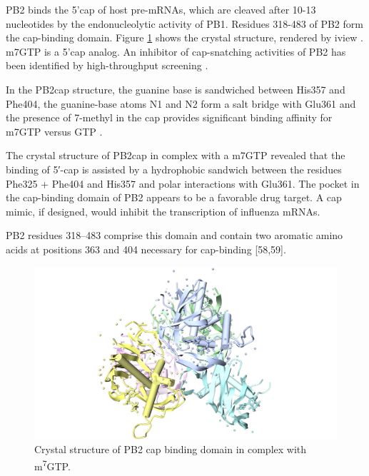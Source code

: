 PB2 binds the 5'cap of host pre-mRNAs, which are cleaved after 10-13 nucleotides by the endonucleolytic activity of PB1. Residues 318-483 of PB2 form the cap-binding domain. Figure \ref{influenza:2VQZ} shows the crystal structure, rendered by iview \citep{1366}. m7GTP is a 5'cap analog. An inhibitor of cap-snatching activities of PB2 has been identified by high-throughput screening \citep{1236}.

In the PB2cap structure, the guanine base is sandwiched between His357 and Phe404, the guanine-base atoms N1 and N2 form a salt bridge with Glu361 and the presence of 7-methyl in the cap provides significant binding affinity for m7GTP versus GTP \citep{1192}.

The crystal structure of PB2cap in complex with a m7GTP revealed that the binding of 5′-cap is assisted by a hydrophobic sandwich between the residues Phe325 + Phe404 and His357 and polar interactions with Glu361. The pocket in the cap-binding domain of PB2 appears to be a favorable drug target. A cap mimic, if designed, would inhibit the transcription of influenza mRNAs.%

PB2 residues 318–483 comprise this domain and contain two aromatic amino acids at positions 363 and 404 necessary for cap-binding [58,59].

\begin{figure}
\centering
\includegraphics[width=\linewidth]{../influenza/2VQZ.png}
\caption{Crystal structure of PB2 cap binding domain in complex with m\textsuperscript{7}GTP.}
\label{influenza:2VQZ}
\end{figure}

